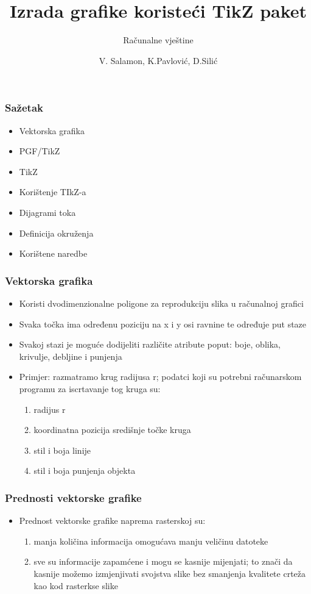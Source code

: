 \documentclass{beamer}
\title[TikZ paket]{Izrada grafike koristeći TikZ paket}
\subtitle{Računalne vještine}
\author{V. Salamon, K.Pavlović, D.Silić}
\date
\begin{document}
	\begin{frame}
	\titlepage
	\end{frame}

	\begin{frame}
	\frametitle{Sažetak}
		\begin{itemize}
			\item Vektorska grafika
			\item PGF/TikZ
			\item TikZ
			\item Korištenje TIkZ-a
			\item Dijagrami toka
			\item Definicija okruženja
			\item Korištene naredbe
		\end{itemize}	
	\end{frame}

	\begin{frame}
	\frametitle{Vektorska grafika}
		\begin{itemize}
			\item Koristi dvodimenzionalne poligone za reprodukciju slika u računalnoj grafici
			\item Svaka točka ima određenu poziciju na x i y osi ravnine te određuje put staze
			\item Svakoj stazi je moguće dodijeliti različite atribute poput: boje, oblika, krivulje, debljine i punjenja
			\item Primjer: razmatramo krug radijusa r; podatci koji su potrebni računarskom programu za iscrtavanje tog kruga su:
			\begin{enumerate}
			\item radijus r
			\item koordinatna pozicija središnje točke kruga
			\item stil i boja linije
			\item stil i boja punjenja objekta
			\end{enumerate}	
		\end{itemize}
	\end{frame}

	\begin{frame}
	\frametitle{Prednosti vektorske grafike}
	\begin{itemize}
		\item Prednost vektorske grafike naprema rasterskoj su:
		\begin{enumerate}
		\item manja količina informacija omogućava manju veličinu datoteke
		\item  sve su informacije zapamćene i mogu se kasnije mijenjati; 
    	to znači da kasnije možemo izmjenjivati svojstva slike
    	bez smanjenja kvalitete crteža kao kod rasterkse slike
		\end{enumerate}	
		\end{itemize}
	\end{frame}
\end{document}
